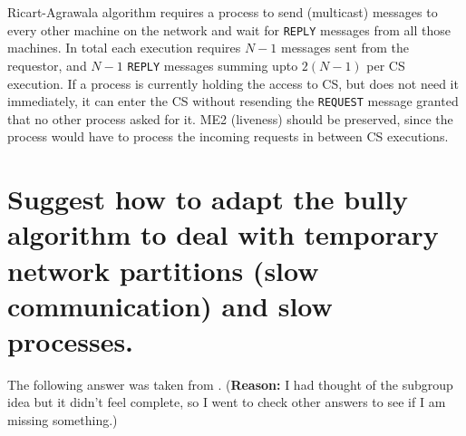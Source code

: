 \documentclass{article}
\begin{document}
Ricart-Agrawala algorithm requires a process to send (multicast) messages to every other machine on the network and wait for \texttt{REPLY} messages from 
all those machines. In total each execution requires $N-1$ messages sent from the requestor, and $N-1$ \texttt{REPLY} messages summing upto $2 (N - 1)$ per CS execution. If a process is currently holding the 
access to CS, but does not need it immediately, it can enter the CS without resending the \texttt{REQUEST} message granted that no other process asked for it. ME2 (liveness) should be preserved, since the process would have to process
the incoming requests in between CS executions.


\section{Suggest how to adapt the bully algorithm to deal with temporary network partitions
(slow communication) and slow processes.}

The following answer was taken from \citet{Borisov}. (\textbf{Reason:} I had thought of the subgroup idea but it didn't feel complete, so I went to check other answers
to see if I am missing something.)



\end{document}
